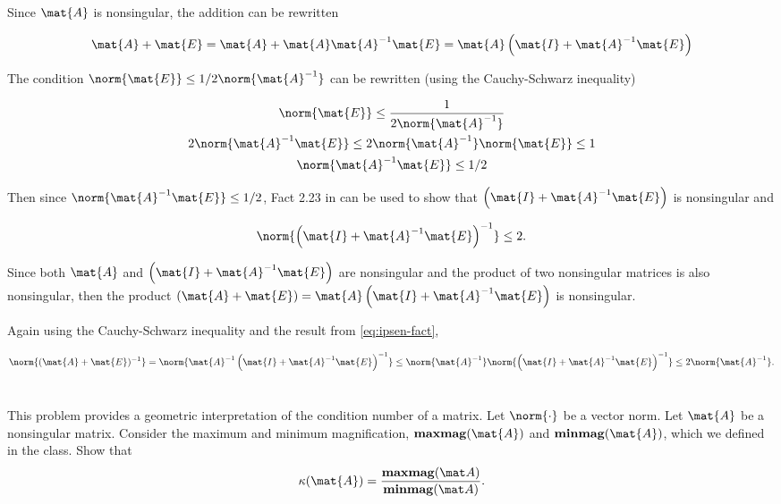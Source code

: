 \documentclass{template}
\newcommand{\maxmag}{\mathrm{\mathbf{maxmag}}}
\newcommand{\minmag}{\mathrm{\mathbf{minmag}}}
\begin{document}
Since $\mat{A}$ is nonsingular, the addition can be rewritten

\begin{equation}\label{eq:decomposition}
    \mat{A} + \mat{E} = \mat{A} + \mat{A}\mat{A}^{-1}\mat{E} = \mat{A} \left( \mat{I} + \mat{A}^{-1}\mat{E} \right)
\end{equation}

The condition $\norm{\mat{E}} \leq 1/2\norm{\mat{A}^{-1}}$ can be rewritten (using the Cauchy-Schwarz inequality)

\begin{equation}\label{eq:norm-inequality}
    \begin{gathered}
        \norm{\mat{E}} \leq \frac{1}{2\norm{\mat{A}^{-1}}}\\
        2\norm{\mat{A}^{-1}\mat{E}}\leq2\norm{\mat{A}^{-1}}\norm{\mat{E}} \leq 1\\
        \norm{\mat{A}^{-1}\mat{E}}\leq 1/2
\end{gathered}
\end{equation}


Then since $\norm{\mat{A}^{-1}\mat{E}} \leq 1/2$, Fact 2.23 in \cite{ipsen2009numerical} can be used to show that $\left( \mat{I} + \mat{A}^{-1}\mat{E} \right)$ is nonsingular and 

\begin{equation}\label{eq:ipsen-fact}
    \norm{\left( \mat{I} + \mat{A}^{-1}\mat{E} \right)^{-1}} \leq 2.
\end{equation}


Since both $\mat{A}$ and $\left( \mat{I} + \mat{A}^{-1}\mat{E} \right)$ are nonsingular and the product of two nonsingular matrices is also nonsingular, then the product $(\mat{A} + \mat{E}) = \mat{A}\left( \mat{I} + \mat{A}^{-1}\mat{E} \right)$ is nonsingular.

Again using the Cauchy-Schwarz inequality and the result from \autoref{eq:ipsen-fact}, 

\begin{equation}
    \norm{(\mat{A}+\mat{E})^{-1}} = \norm{\mat{A}^{-1}\left( \mat{I} + \mat{A}^{-1}\mat{E} \right)^{-1}} \leq \norm{\mat{A}^{-1}}\norm{\left( \mat{I} + \mat{A}^{-1}\mat{E} \right)^{-1}} \leq 2\norm{\mat{A}^{-1}}.
\end{equation}





\section{}
This problem provides a geometric interpretation of the condition
number of a matrix. Let $\norm{\cdot}$ be a vector norm. 
Let $\mat{A}$ be a nonsingular matrix.
Consider the maximum and minimum magnification, 
$\maxmag(\mat{A})$ and $\minmag(\mat{A})$, 
which we defined in the class.  
Show that 
\[
   \kappa(\mat{A}) = \frac{\maxmag(\mat A)}{\minmag(\mat A)}.
\]
\end{document}
